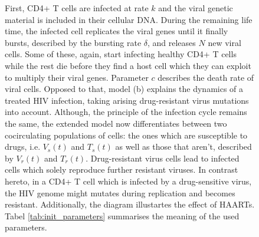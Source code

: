 \begin{figure}
{    First, CD4+ T cells are infected at rate $k$ and the viral genetic material is included in their cellular DNA.
    During the remaining life time, the infected cell replicates the viral genes until it finally bursts, described by the bursting rate $\delta$, and releases $N$ new viral cells.
    Some of these, again, start infecting healthy CD4+ T cells while the rest die before they find a host cell which they can exploit to multiply their viral genes.
    Parameter $c$ describes the death rate of viral cells.
    Opposed to that, model (b) explains the dynamics of a treated HIV infection, taking arising drug-resistant virus mutations into account.
    Although, the principle of the infection cycle remains the same, the extended model now differentiates between two cocirculating populations of cells: the ones which are susceptible to drugs, i.e. $V_s(t)$ and $T_s(t)$ as well as those that aren't, described by $V_r(t)$ and $T_r(t)$.
    Drug-resistant virus cells lead to infected cells which solely reproduce further resistant viruses.
    In contrast hereto, in a CD4+ T cell which is infected by a drug-sensitive virus, the HIV genome might mutates during replication and becomes resistant.
    Additionally, the diagram illustartes the effect of HAARTs.
    Tabel \ref{tab:init_parameters} summarises the meaning of the used parameters.
    }
    \label{fig:infection_schemes}
\end{figure}

